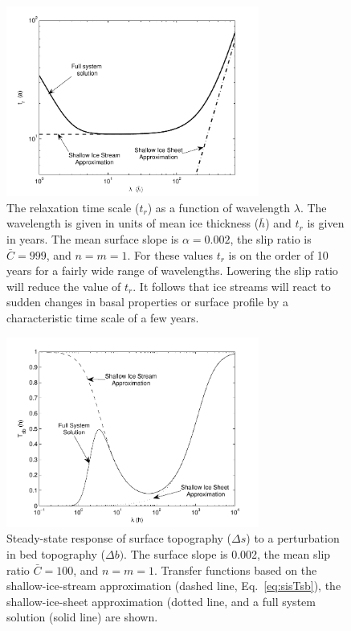 \documentclass[10pt,a4paper]{book}
\begin{document}
\begin{figure}
\vspace*{2mm}
\centerline{
\includegraphics[width=8.3cm]{tc-2007-0016-f03.pdf}
}
\caption{The relaxation time scale ($t_r$) as a function of wavelength
$\lambda$.  The wavelength is given in units of mean ice thickness
($\bar{h}$) and $t_r$ is given in years. The mean surface slope is
$\alpha{=}0.002$, the slip ratio is $\bar{C}{=}999$, and $n=m=1$. For
these values $t_r$ is on the order of 10 years for a fairly wide range
of wavelengths. Lowering the slip ratio will reduce the value of
$t_r$. It follows that ice streams will react to sudden changes in
basal properties or surface profile by a characteristic time scale of
a few years.
\label{fig:tr}}
\end{figure}

\begin{figure}
\vspace*{2mm}
\centerline{\includegraphics[width=8.3cm]{tc-2007-0016-f04.pdf}}
\caption{Steady-state response of surface topography ($\Delta s$) to a 
perturbation in bed topography ($\Delta b)$. The surface slope is
0.002, the mean slip ratio $\bar{C}{=}100$, and $n=m=1$. Transfer
functions based on the shallow-ice-stream approximation (dashed line,
Eq.~\ref{eq:sisTsb}), the shallow-ice-sheet approximation (dotted
line, and a full system solution (solid line) are shown.
\label{fig:Tsbl_ss}}
\end{figure}
\end{document}
